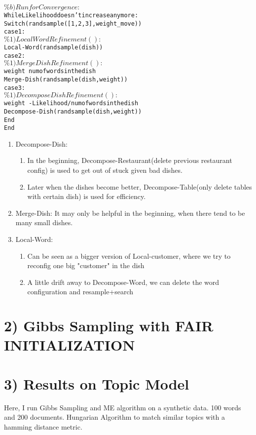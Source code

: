 \documentclass{article}
\begin{document}
\begin{spacing}{1.1}
\begin{alltt}
  \(\%b)Run for Convergence:\)
      While Likelihood doesn't increase any more:          
          Switch(randsample([1,2,3],weight_move))
              case 1:
              \(\%1)Local Word Refinement () :\)
                    Local-Word(randsample(dish))
              case 2:
              \(\%1)Merge Dish Refinement () :\)
                    weight~num of words in the dish
                    Merge-Dish(randsample(dish,weight))
              case 3:
              \(\%1)Decompose Dish Refinement () :\)
                    weight~-Likelihood/num of words in the dish
		    Decompose-Dish(randsample(dish,weight))
	  End
      End
\end{alltt}
\begin{enumerate}[i]
 \item Decompose-Dish:
\begin{enumerate}[a]
 \item In the beginning, Decompose-Restaurant(delete previous restaurant config) is used to get out of stuck given bad dishes.
 \item Later when the dishes become better, Decompose-Table(only delete tables with certain dish) is used for efficiency.
\end{enumerate}
 \item Merge-Dish: It may only be helpful in the beginning, when there tend to be many small dishes.
 \item Local-Word: 
\begin{enumerate}[a]
 \item Can be seen as a bigger version of Local-customer, where we try to reconfig one big "customer" in the dish
 \item A little drift away to Decompose-Word, we can delete the word configuration and resample+search 
\end{enumerate}
\end{enumerate}


\section{2) Gibbs Sampling with FAIR INITIALIZATION}
\section{3) Results on Topic Model}
Here, I run Gibbs Sampling and ME algorithm on a synthetic data. 100 words and 200 documents.
Hungarian Algorithm to match similar topics with a hamming distance metric.
\end{spacing}
\end{document}
